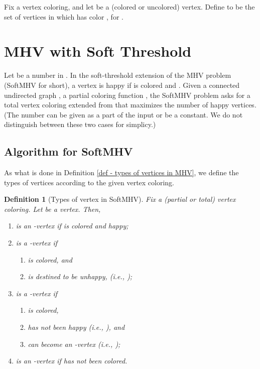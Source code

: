 \documentclass[11pt]{article}
\newtheorem{definition}{Definition}[section]
\begin{document}
Fix a vertex coloring, and let  be a (colored or uncolored) vertex.
Define  to be the set of vertices in  which has color ,
for .




\section{MHV with Soft Threshold}
Let  be a number in . In the soft-threshold extension of
the MHV problem (SoftMHV for short), a vertex  is happy if  is
colored and .
Given a connected undirected graph , a partial coloring function ,
the SoftMHV problem asks for a total vertex coloring extended from  that
maximizes the number of happy vertices.
(The number  can be given as a part of the input or be a constant.
We do not distinguish between these two cases for simplicy.)




\subsection{Algorithm for SoftMHV}
As what is done in Definition \ref{def - types of vertices in MHV},
we define the types of vertices according to the given vertex coloring.

\begin{definition}[Types of vertex in SoftMHV]
\label{def - types of vertex - SoftMHV}
Fix a (partial or total) vertex coloring. Let  be a vertex. Then,
\begin{enumerate}
\item  is an -vertex if  is colored and happy;

\item  is a -vertex if
\begin{enumerate}
\item  is colored, and
\item  is destined to be unhappy, (i.e., );
\end{enumerate}

\item  is a -vertex if
\begin{enumerate}
\item  is colored,
\item  has not been happy (i.e., ), and
\item  can become an -vertex (i.e., );
\end{enumerate}

\item  is an -vertex if  has not been colored.
\end{enumerate}
\end{definition}
\end{document}
